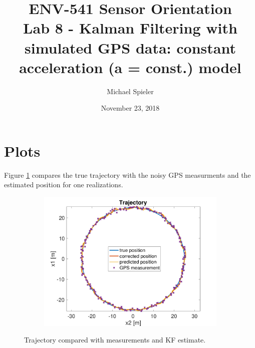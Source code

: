 \documentclass{article}
\title{ENV-541 Sensor Orientation\\Lab 8 - Kalman Filtering with simulated GPS data: constant acceleration (a = const.) model}
\author{Michael Spieler}
\date{November 23, 2018}
\begin{document}
\maketitle

\section*{Plots}

Figure \ref{fig:traj} compares the true trajectory with the noisy GPS measurments and the estimated position for one realizations.

\begin{figure}[H]
    \centering
    \begin{subfigure}[t]{0.8\textwidth}
        \centering
        \includegraphics[width=\textwidth]{traj}
    \end{subfigure}
    \caption{Trajectory compared with measurements and KF estimate.}
    \label{fig:traj}
\end{figure}
\end{document}

